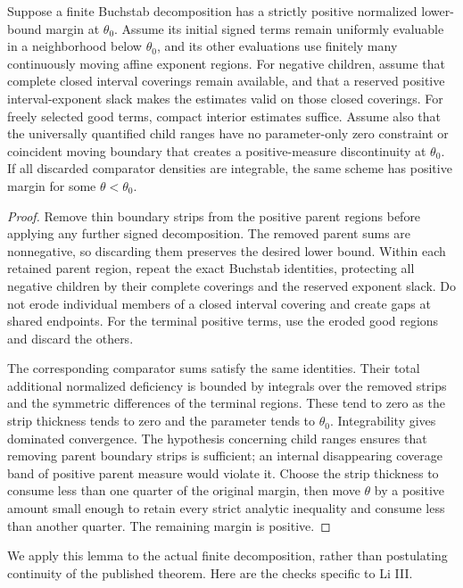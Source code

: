 \begin{lemma}\label{lem:stability}
Suppose a finite Buchstab decomposition has a strictly positive
normalized lower-bound margin at $\theta_0$.
Assume its initial signed terms remain uniformly evaluable in a
neighborhood below $\theta_0$, and its other evaluations use finitely
many continuously moving affine exponent regions.
For negative children, assume that complete closed interval coverings
remain available, and that a reserved positive interval-exponent
slack makes the estimates valid on those closed coverings.
For freely selected good terms, compact interior estimates suffice.
Assume also that the universally quantified child ranges have no
parameter-only zero constraint or coincident moving boundary that
creates a positive-measure discontinuity at $\theta_0$.
If all discarded comparator densities are integrable, the same
scheme has positive margin for some $\theta<\theta_0$.
\end{lemma}

\begin{proof}
Remove thin boundary strips from the positive parent regions before
applying any further signed decomposition.
The removed parent sums are nonnegative, so discarding them preserves
the desired lower bound.
Within each retained parent region, repeat the exact Buchstab
identities, protecting all negative children by their complete
coverings and the reserved exponent slack. Do not erode individual
members of a closed interval covering and create gaps at shared endpoints.
For the terminal positive terms, use the eroded good regions and
discard the others.

The corresponding comparator sums satisfy the same identities.
Their total additional normalized deficiency is bounded by integrals
over the removed strips and the symmetric differences of the
terminal regions.
These tend to zero as the strip thickness tends to zero and the
parameter tends to $\theta_0$.
Integrability gives dominated convergence.
The hypothesis concerning child ranges ensures that removing
parent boundary strips is sufficient; an internal disappearing
coverage band of positive parent measure would violate it.
Choose the strip thickness to consume less than one quarter of the
original margin, then move $\theta$ by a positive amount small enough
to retain every strict analytic inequality and consume less than
another quarter.
The remaining margin is positive.
\end{proof}

We apply this lemma to the actual finite decomposition, rather than
postulating continuity of the published theorem.
Here are the checks specific to Li III.

